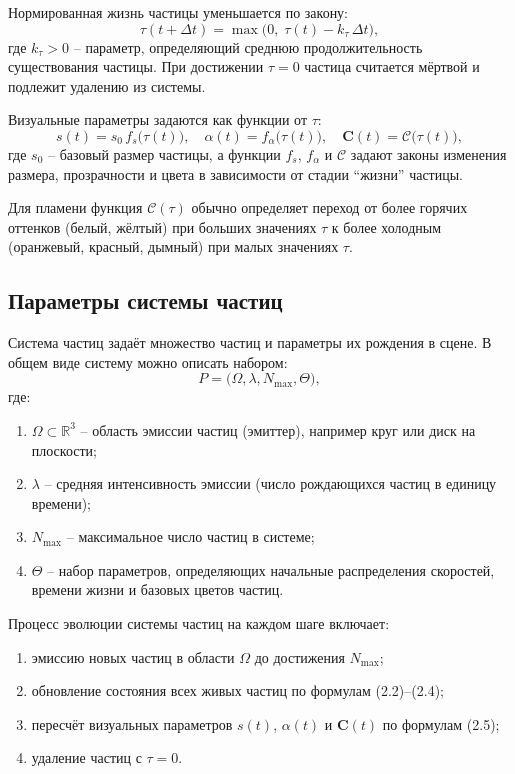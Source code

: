 Нормированная жизнь частицы уменьшается по закону:
\begin{equation}
	\tau(t + \Delta t) = \max\bigl(0,\; \tau(t) - k_{\tau}\,\Delta t\bigr),
\end{equation}
где $k_{\tau} > 0$ -- параметр, определяющий среднюю продолжительность существования частицы. При достижении $\tau = 0$ частица считается мёртвой и подлежит удалению из системы.

Визуальные параметры задаются как функции от $\tau$:
\begin{equation}
	s(t) = s_{0}\, f_{s}\bigl(\tau(t)\bigr), \quad
	\alpha(t) = f_{\alpha}\bigl(\tau(t)\bigr), \quad
	\mathbf{C}(t) = \mathcal{C}\bigl(\tau(t)\bigr),
\end{equation}
где $s_{0}$ -- базовый размер частицы, а функции $f_{s}$, $f_{\alpha}$ и $\mathcal{C}$ задают законы изменения размера, прозрачности и цвета в зависимости от стадии ``жизни'' частицы.\cite{EckCG}

Для пламени функция $\mathcal{C}(\tau)$ обычно определяет переход от более горячих оттенков (белый, жёлтый) при больших значениях $\tau$ к более холодным (оранжевый, красный, дымный) при малых значениях $\tau$.

\subsection{Параметры системы частиц}

Система частиц задаёт множество частиц и параметры их рождения в сцене. В общем виде систему можно описать набором:
\begin{equation}
	P = \bigl( \Omega, \lambda, N_{\max}, \Theta \bigr),
\end{equation}
где:
\begin{enumerate}
	\item $\Omega \subset \mathbb{R}^{3}$ -- область эмиссии частиц (эмиттер), например круг или диск на плоскости;
	\item $\lambda$ -- средняя интенсивность эмиссии (число рождающихся частиц в единицу времени);
	\item $N_{\max}$ -- максимальное число частиц в системе;
	\item $\Theta$ -- набор параметров, определяющих начальные распределения скоростей, времени жизни и базовых цветов частиц.
\end{enumerate}

Процесс эволюции системы частиц на каждом шаге включает:
\begin{enumerate}
	\item эмиссию новых частиц в области $\Omega$ до достижения $N_{\max}$;
	\item обновление состояния всех живых частиц по формулам (2.2)–(2.4);
	\item пересчёт визуальных параметров $s(t)$, $\alpha(t)$ и $\mathbf{C}(t)$ по формулам (2.5);
	\item удаление частиц с $\tau = 0$.
\end{enumerate}


